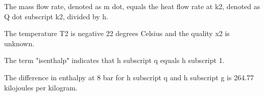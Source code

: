 The mass flow rate, denoted as m dot, equals the heat flow rate at k2, denoted as Q dot subscript k2, divided by h.

The temperature T2 is negative 22 degrees Celsius and the quality x2 is unknown.

The term "isenthalp" indicates that h subscript q equals h subscript 1.

The difference in enthalpy at 8 bar for h subscript q and h subscript g is 264.77 kilojoules per kilogram.